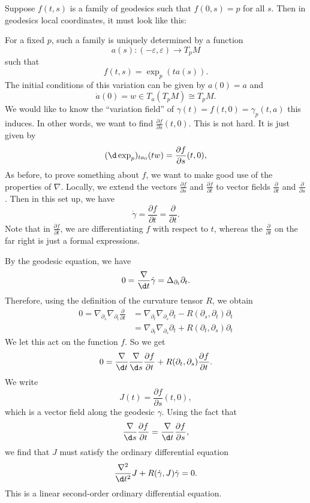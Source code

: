 \documentclass[a4paper]{article}
\begin{document}
Suppose $f(t, s)$ is a family of geodesics such that $f(0, s) = p$ for all $s$. Then in geodesics local coordinates, it must look like this:
\begin{center}
\end{center}
For a fixed $p$, such a family is uniquely determined by a function
\[
  a(s): (-\varepsilon, \varepsilon) \to T_p M
\]
such that
\[
  f(t, s) = \exp_p(t a(s)).
\]
The initial conditions of this variation can be given by $a(0) = a$ and
\[
  \dot{a}(0) = w \in T_a(T_p M) \cong T_p M.
\]
We would like to know the ``variation field'' of $\gamma(t) = f(t, 0) = \gamma_p(t, a)$ this induces. In other words, we want to find $\frac{\partial f}{\partial s} (t, 0)$. This is not hard. It is just given by
\[
  (\d \exp_p)_{t a_0} (tw) = \frac{\partial f}{\partial s}(t, 0),
\]
As before, to prove something about $f$, we want to make good use of the properties of $\nabla$. Locally, we extend the vectors $\frac{\partial f}{\partial s}$ and $\frac{\partial f}{\partial t}$ to vector fields $\frac{\partial}{\partial t}$ and $\frac{\partial}{\partial s}$. Then in this set up, we have
\[
  \dot{\gamma} = \frac{\partial f}{\partial t} = \frac{\partial}{\partial t}.
\]
Note that in $\frac{\partial f}{\partial t}$, we are differentiating $f$ with respect to $t$, whereas the $\frac{\partial}{\partial t}$ on the far right is just a formal expressions.

By the geodesic equation, we have
\[
  0 = \frac{\nabla}{\d t} \dot{\gamma} = \Delta_{\partial_t} \partial_t.
\]
Therefore, using the definition of the curvature tensor $R$, we obtain
\begin{align*}
  0 = \nabla_{\partial_s} \nabla_{\partial_t} \frac{\partial}{\partial t} &= \nabla_{\partial_t} \nabla_{\partial_s} \partial_t - R(\partial_s, \partial_t) \partial_t\\
  &= \nabla_{\partial_t} \nabla_{\partial_s} \partial_t + R(\partial_t, \partial_s) \partial_t
\end{align*}
We let this act on the function $f$. So we get
\[
  0 = \frac{\nabla}{\d t} \frac{\nabla}{\d s} \frac{\partial f}{\partial t} + R(\partial_t, \partial_s) \frac{\partial f}{\partial t}.
\]
We write
\[
  J(t) = \frac{\partial f}{\partial s}(t, 0),
\]
which is a vector field along the geodesic $\gamma$. Using the fact that
\[
  \frac{\nabla}{\d s} \frac{\partial f}{\partial t} = \frac{\nabla}{\d t} \frac{\partial f}{\partial s},
\]
we find that $J$ must satisfy the ordinary differential equation
\[
  \frac{\nabla^2}{\d t^2} J + R(\dot{\gamma}, J) \dot{\gamma} = 0.
\]
This is a linear second-order ordinary differential equation.
\end{document}

